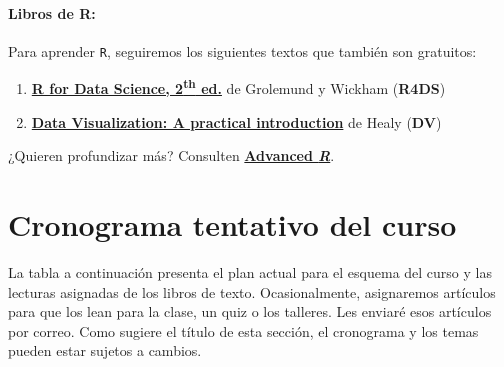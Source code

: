 \documentclass[10pt]{article}
\begin{document}
	
	\paragraph{Libros de R:} Para aprender \texttt{R}, seguiremos los siguientes textos que también son gratuitos:
	
	\begin{enumerate}
		\item \href{https://r4ds.hadley.nz/}{\textbf{R for Data Science, 2\textsuperscript{th} ed.}} de Grolemund y Wickham (\textbf{R4DS})
		\item \href{http://socviz.co/}{\textbf{Data Visualization: A practical introduction}} de Healy (\textbf{DV})
	\end{enumerate}
	
	¿Quieren profundizar más? Consulten \href{http://adv-r.had.co.nz/}{\textbf{Advanced \textit{R}}}.
	
	
	\pagebreak
	
	
	\section*{Cronograma tentativo del curso}
	
	La tabla a continuación presenta el plan actual para el esquema del curso y las lecturas asignadas de los libros de texto. Ocasionalmente, asignaremos artículos para que los lean para la clase, un quiz o los talleres. Les enviaré esos artículos por correo. Como sugiere el título de esta sección, el cronograma y los temas pueden estar sujetos a cambios.
	
\end{document}
